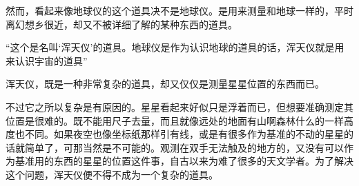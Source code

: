然而，看起来像地球仪的这个道具决不是地球仪。是用来测量和地球一样的，平时离幻想乡很近，却又不被详细了解的某种东西的道具。

“这个是名叫‘浑天仪’的道具。地球仪是作为认识地球的道具的话，浑天仪就是用来认识宇宙的道具”

浑天仪，既是一种非常复杂的道具，却又仅仅是测量星星位置的东西而已。

不过它之所以复杂是有原因的。星星看起来好似只是浮着而已，但想要准确测定其位置是很难的。既不能用尺子去量，而且就像远处的地面有山啊森林什么的一样高度也不同。如果夜空也像坐标纸那样引有线，或是有很多作为基准的不动的星星的话就简单了，可那当然是不可能的。观测在双手无法触及的地方的，又没有可以作为基准用的东西的星星的位置这件事，自古以来为难了很多的天文学者。为了解决这个问题，浑天仪便不得不成为一个复杂的道具。